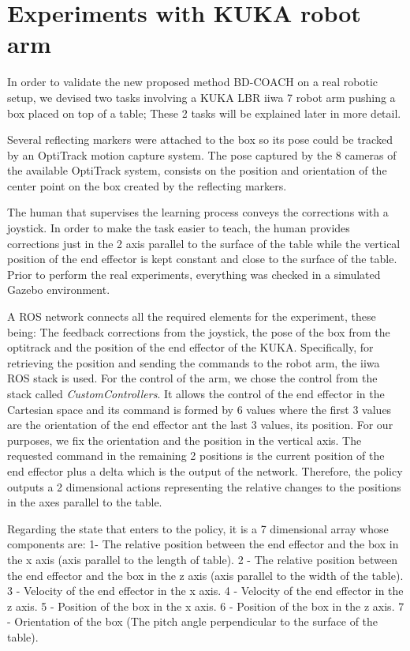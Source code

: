 \section{Experiments with KUKA robot arm}
\label{section:Experiments with KUKA robot arm}

In order to validate the new proposed method BD-COACH on a real robotic setup, we devised two tasks involving a KUKA LBR iiwa 7 robot arm pushing a box placed on top of a table; These 2 tasks will be explained later in more detail.

Several reflecting markers were attached to the box so its pose could be tracked by an OptiTrack motion capture system. The pose captured by the 8 cameras of the available OptiTrack system, consists on the position and orientation of the center point on the box created by the reflecting markers. 

The human that supervises the learning process conveys the corrections with a joystick. In order to make the task easier to teach, the human provides corrections just in the 2 axis parallel to the surface of the table while the vertical position of the end effector is kept constant and close to the surface of the table. Prior to perform the real experiments, everything was checked in a simulated Gazebo environment.

A ROS network connects all the required elements for the experiment, these being: The feedback corrections from the joystick, the pose of the box from the optitrack and the position of the end effector of the KUKA. Specifically, for retrieving the position and sending the commands to the robot arm, the iiwa ROS stack \cite{iiwa} is used. For the control of the arm, we chose the control from the stack called \textit{CustomControllers}. It allows the control of the end effector in the Cartesian space and its command is formed by 6 values where the first 3 values are the orientation of the end effector ant the last 3 values, its position. For our purposes, we fix the orientation and the position in the vertical axis. The requested command in the remaining 2 positions is the current position of the end effector plus a delta which is the output of the network. Therefore, the policy outputs a 2 dimensional actions representing the relative changes to the positions in the axes parallel to the table.

Regarding the state that enters to the policy, it is a 7 dimensional array whose components are: 1- The relative position between the end effector and the box in the x axis (axis parallel to the length of table).
2 - The relative position between the end effector and the box in the z axis (axis parallel to the width of the table).
3 - Velocity of the end effector in the x axis.
4 - Velocity of the end effector in the z axis.
5 - Position of the box in the x axis.
6 - Position of the box in the z axis.
7 - Orientation of the box (The pitch angle perpendicular to the surface of the table).

